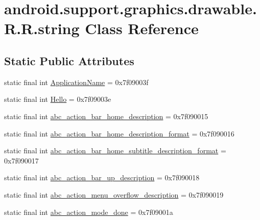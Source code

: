 \hypertarget{classandroid_1_1support_1_1graphics_1_1drawable_1_1_r_1_1string}{
\section{android.support.graphics.drawable.R.R.string Class Reference}
\label{classandroid_1_1support_1_1graphics_1_1drawable_1_1_r_1_1string}
}
\subsection*{Static Public Attributes}
\begin{CompactItemize}
\item 
static final int \hyperlink{classandroid_1_1support_1_1graphics_1_1drawable_1_1_r_1_1string_4439c6e3ad0d0be13f70253a3c2f1051}{ApplicationName} = 0x7f09003f
\item 
static final int \hyperlink{classandroid_1_1support_1_1graphics_1_1drawable_1_1_r_1_1string_827944ae52a9c2ac081a322fe8831a34}{Hello} = 0x7f09003e
\item 
static final int \hyperlink{classandroid_1_1support_1_1graphics_1_1drawable_1_1_r_1_1string_d62e5f59b1262666d33e42a6736ab418}{abc\_\-action\_\-bar\_\-home\_\-description} = 0x7f090015
\item 
static final int \hyperlink{classandroid_1_1support_1_1graphics_1_1drawable_1_1_r_1_1string_7962a5d2a7798e7c211cf5153b47a3d4}{abc\_\-action\_\-bar\_\-home\_\-description\_\-format} = 0x7f090016
\item 
static final int \hyperlink{classandroid_1_1support_1_1graphics_1_1drawable_1_1_r_1_1string_3ba24ce5e0d97be3a3f5bb1c74de5ef2}{abc\_\-action\_\-bar\_\-home\_\-subtitle\_\-description\_\-format} = 0x7f090017
\item 
static final int \hyperlink{classandroid_1_1support_1_1graphics_1_1drawable_1_1_r_1_1string_1495582c44d14976791bc270dabc40ed}{abc\_\-action\_\-bar\_\-up\_\-description} = 0x7f090018
\item 
static final int \hyperlink{classandroid_1_1support_1_1graphics_1_1drawable_1_1_r_1_1string_a6750c60b835ded06726a4834c43528b}{abc\_\-action\_\-menu\_\-overflow\_\-description} = 0x7f090019
\item 
static final int \hyperlink{classandroid_1_1support_1_1graphics_1_1drawable_1_1_r_1_1string_7b5e6bc1ddfbbad6e200f24ec98f1c44}{abc\_\-action\_\-mode\_\-done} = 0x7f09001a
\item 

\end{CompactItemize}
